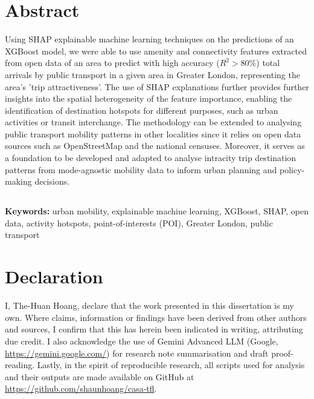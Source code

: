 \chapter*{Abstract}
Using SHAP explainable machine learning techniques on the predictions of an XGBoost model, we were able to use amenity and connectivity features extracted from open data of an area to predict with high accuracy ($R^2>80\%$) total arrivals by public transport in a given area in Greater London, representing the area's 'trip attractiveness'. The use of SHAP explanations further provides further insights into the spatial heterogeneity of the feature importance, enabling the identification of destination hotspots for different purposes, such as urban activities or transit interchange. The methodology can be extended to analysing public transport mobility patterns in other localities since it relies on open data sources such as OpenStreetMap and the national censuses. Moreover, it serves as a foundation to be developed and adapted to analyse intracity trip destination patterns from mode-agnostic mobility data to inform urban planning and policy-making decisions.

\section*{}
\textbf{Keywords:} urban mobility, explainable machine learning, XGBoost, SHAP, open data, activity hotspots, point-of-interests (POI), Greater London, public transport

\chapter*{Declaration}
I, The-Huan Hoang, declare that the work presented in this dissertation is my own. Where claims, information or findings have been derived from other authors and sources, I confirm that this has herein been indicated in writing, attributing due credit. I also acknowledge the use of Gemini Advanced LLM (Google, \url{https://gemini.google.com/}) for research note summarisation and draft proof-reading. Lastly, in the spirit of reproducible research, all scripts used for analysis and their outputs are made available on GitHub at \url{https://github.com/shaunhoang/casa-tfl}. 

